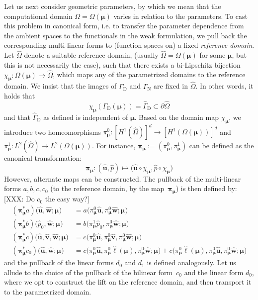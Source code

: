 \documentclass[onecolumn, twoside, a4paper, 11pt]{article}
\begin{document}
Let us next consider geometric parameters, by which we mean that
the computational domain $\Omega = \Omega(\bm \mu)$ varies in relation to the parameters.
To cast this problem in canonical form, i.e. to transfer the parameter dependence
from the ambient spaces to the functionals in the weak formulation, we pull back
the corresponding multi-linear forms to (function spaces on) a fixed \emph{reference domain}.
Let $\hat{\Omega}$ denote a suitable reference domain, (usually
$\hat{\Omega} = \Omega({\bm \mu})$ for some $\bm \mu$, but this is not
necessarily the case), such that there exists a bi-Lipschitz bijection
$\chi_{\bm \mu} : \Omega(\bm \mu) \to\hat{\Omega}$,
which maps any of the parametrized domains to the reference domain. We insist that
the images of $\Gamma_\text{D}$ and $\Gamma_\text{N}$ are fixed in $\hat{\Omega}$.
In other words, it holds that
%
\begin{equation}
  \chi_{\bm \mu}( \Gamma_\text{D}(\bm \mu) ) =
  \hat{\Gamma}_\text{D} \subset \partial \hat{\Omega}
\end{equation}
%
and that $\hat{\Gamma}_\text{D}$ as defined is independent of $\bm
\mu$. Based on the domain map $\chi_{\bm \mu}$, we introduce
two homeomorphisms ${\pi}_{\bm\mu}^0:[H^1(\hat{\Omega})]^d\to{}[H^1(\Omega(\bm \mu))]^d$
and ${\pi}_{\bm\mu}^1:L^2(\hat{\Omega})\to{}L^2(\Omega(\bm{\mu}))$. For instance,
$\bm{\pi}_{\bm\mu}:=({\pi}_{\bm\mu}^0,{\pi}_{\bm\mu}^1)$ can be defined as the canonical
transformation:
%
\begin{equation}
\bm{\pi}_{\bm\mu}:(\hat{\bm{u}},\hat{p})\mapsto\big(\hat{\bm{u}}\circ\chi_{\bm\mu},\hat{p}\circ\chi_{\bm\mu}\big)
\end{equation}
%
However, alternate maps can be constructed. The pullback of the multi-linear forms
$a,b,c,c_0$ (to the reference domain, by the map~$\bm{\pi}_{\bm\mu}$) is then defined by:
[XXX: Do $c_0$ the easy way?]
%
\begin{equation}
\begin{aligned}
({\bm\pi}^*_{\bm\mu}a)\big(\hat{\bm{u}},\hat{\bm{w}};\bm{\mu}\big)
&=
a\big({\pi}_{\bm\mu}^0\hat{\bm{u}},{\pi}_{\bm\mu}^0\hat{\bm{w}};\bm{\mu}\big)
\\
({\bm\pi}^*_{\bm\mu}b)\big(\hat{p}_0,\hat{\bm{w}};\bm{\mu}\big)
&=
b\big({\pi}_{\bm\mu}^1\hat{p}_0,{\pi}_{\bm\mu}^0\hat{\bm{w}};\bm{\mu}\big)
\\
({\bm\pi}^*_{\bm\mu}c)\big(\hat{\bm{u}},\hat{\bm{v}},\hat{\bm{w}};\bm{\mu}\big)
&=
c\big({\pi}_{\bm\mu}^0\hat{\bm{u}},{\pi}_{\bm\mu}^0\hat{\bm{v}},{\pi}_{\bm\mu}^0\hat{\bm{w}};\bm{\mu}\big)
\\
({\bm\pi}^*_{\bm\mu}c_0)\big(\hat{\bm{u}},\hat{\bm{w}};\bm{\mu}\big)
&=
c\big({\pi}_{\bm\mu}^0\hat{\bm{u}},{\pi}_{\bm\mu}^0\hat{\bm{\ell}}(\bm{\mu}),{\pi}_{\bm\mu}^0\hat{\bm{w}};\bm{\mu}\big)
+
c\big({\pi}_{\bm\mu}^0\hat{\bm{\ell}}(\bm{\mu}),{\pi}_{\bm\mu}^0\hat{\bm{u}},{\pi}_{\bm\mu}^0\hat{\bm{w}};\bm{\mu}\big)
\end{aligned}
\end{equation}
%
and the pullback of the linear forms $d_0$ and $d_1$ is defined analogously. Let us allude to the
choice of the pullback of the bilinear form~$c_0$ and the linear form $d_0$, where we opt to construct
the lift on the reference domain, and then transport it to the parametrized domain.
\end{document}
